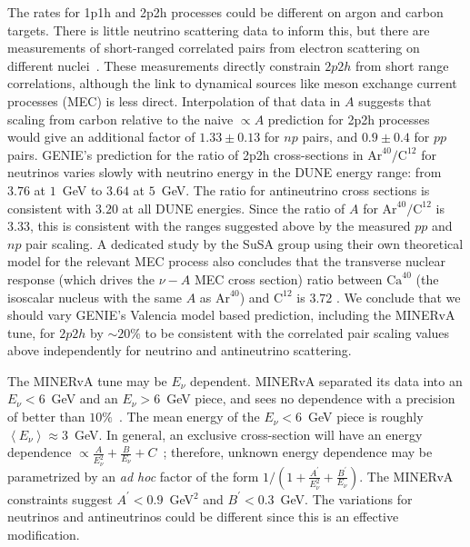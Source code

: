 
 The rates for 1p1h and 2p2h processes could be different on argon and carbon targets.  There is little neutrino scattering data to inform this, but there are measurements of short-ranged correlated pairs from electron scattering on different nuclei~\cite{Colle:2015ena}.  These measurements directly constrain $2p2h$ from short range correlations, although the link to dynamical sources like meson exchange current processes (MEC) is less direct.  Interpolation of that data in $A$ suggests that scaling from carbon relative to the naive $\propto A$ prediction for 2p2h processes would give an additional factor of $1.33\pm 0.13$ for $np$ pairs, and $0.9\pm 0.4$ for $pp$ pairs.
GENIE's prediction for the ratio of 2p2h cross-sections in $\text{Ar}^{40}/\text{C}^{12}$ for neutrinos varies slowly with neutrino energy in the DUNE energy range: from $3.76$ at $1$~GeV to $3.64$ at $5$~GeV. The ratio for antineutrino cross sections is consistent with $3.20$ at all DUNE energies. Since the ratio of $A$ for $\text{Ar}^{40}/\text{C}^{12}$ is $3.33$, this is consistent with the ranges suggested above by the measured $pp$ and $np$ pair scaling.  A dedicated study by the SuSA group using their own theoretical model for the relevant MEC process also concludes that the transverse nuclear response (which drives the $\nu-A$ MEC cross section) ratio between $\text{Ca}^{40}$ (the isoscalar nucleus with the same $A$ as $\text{Ar}^{40}$) and $\text{C}^{12}$ is $3.72$ \cite{Amaro:2017eah}.   We conclude that we should vary GENIE's Valencia model based prediction, including the MINERvA tune, for $2p2h$ by $\sim 20\%$ to be consistent with the correlated pair scaling values above independently for neutrino and antineutrino scattering. 

 The MINERvA tune may be $E_\nu$ dependent. MINERvA separated its data into an $E_\nu<6$~GeV and an $E_\nu>$6~GeV piece, and sees no dependence with a precision of better than $10\%$~\cite{Rodrigues:2015hik}.  The mean energy of the $E_\nu<6$~GeV piece is roughly $\left< E_\nu\right>\approx 3$~GeV.  In general, an exclusive cross-section will have an energy dependence $\propto \frac{A}{E_\nu^2}+\frac{B}{E_\nu}+C$~\cite{llewelyn-smith}; therefore, unknown energy dependence may be parametrized by an {\em ad hoc} factor of the form $1/\left(1+ \frac{A^{'}}{E_\nu^2 }+\frac{B^{'}}{E_\nu}\right)$.  The MINERvA constraints suggest $A^{'}<0.9$~GeV$^2$ and $B^{'}<0.3$~GeV.  The variations for neutrinos and antineutrinos could be different since this is an effective modification.

